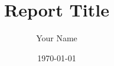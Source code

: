\usepackage{graphicx}
\usepackage{times}
\usepackage{amsmath}
\usepackage{pkg/titlesec}
\usepackage{parskip}
\usepackage{pkg/titletoc}
\usepackage[a4paper,left=1.5in,right=1in,top=1in,bottom=1in]{geometry}
\linespread{1.5}
\setlength{\parskip}{0pt}
\fontsize{12}{14.4}
\title{Report Title}
\author{Your Name}
\date{\today}


